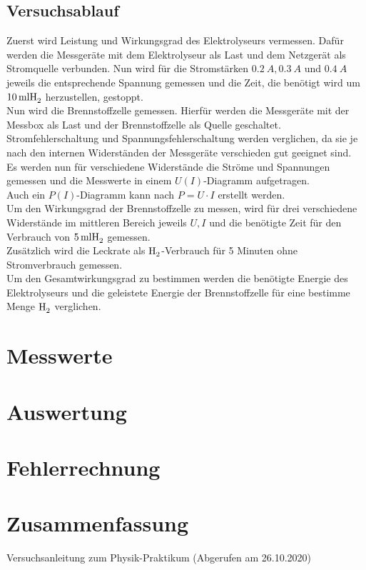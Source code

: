 \documentclass[a4paper,12pt,bibtotocnumbered]{scrartcl}
\numberwithin{equation}{section} %
\begin{document}
\subsection{Versuchsablauf}
Zuerst wird Leistung und Wirkungsgrad des Elektrolyseurs vermessen. Dafür werden die Messgeräte mit dem Elektrolyseur als Last und dem Netzgerät als Stromquelle verbunden. Nun wird für die Stromstärken $\SI{0,2}{A},\SI{0,3}{A}$ und $\SI{0,4}{A}$ jeweils die entsprechende Spannung gemessen und die Zeit, die benötigt wird um $\SI{10}{ml}\ce{H_2}$ herzustellen, gestoppt.\\

Nun wird die Brennstoffzelle gemessen. Hierfür werden die Messgeräte mit der Messbox als Last und der Brennstoffzelle als Quelle geschaltet. Stromfehlerschaltung und Spannungsfehlerschaltung werden verglichen, da sie je nach den internen Widerständen der Messgeräte verschieden gut geeignet sind.\\
Es werden nun für verschiedene Widerstände die Ströme und Spannungen gemessen und die Messwerte in einem $U(I)$-Diagramm aufgetragen. \\
Auch ein $P(I)$-Diagramm kann nach $P=U\cdot I$ erstellt werden.\\

Um den Wirkungsgrad der Brennstoffzelle zu messen, wird für drei verschiedene Widerstände im mittleren Bereich jeweils $U,I$ und die benötigte Zeit für den Verbrauch von $\SI{5}{ml}\ce{H_2}$ gemessen.\\Zusätzlich wird die Leckrate als $\ce{H_2}$-Verbrauch für 5 Minuten ohne Stromverbrauch gemessen. \\

Um den Gesamtwirkungsgrad zu bestimmen werden die benötigte Energie des Elektrolyseurs und die geleistete Energie der Brennstoffzelle für eine bestimme Menge $\ce{H_2}$ verglichen.

\section[Messwerte]{Messwerte}
\section[Auswertung]{Auswertung}
\section[Fehlerrechnung]{Fehlerrechnung}
\section[Zusammenfassung]{Zusammenfassung}
\begin{thebibliography}{999}
 Versuchsanleitung zum Physik-Praktikum (Abgerufen am 26.10.2020) 
\end{thebibliography}
\end{document}
